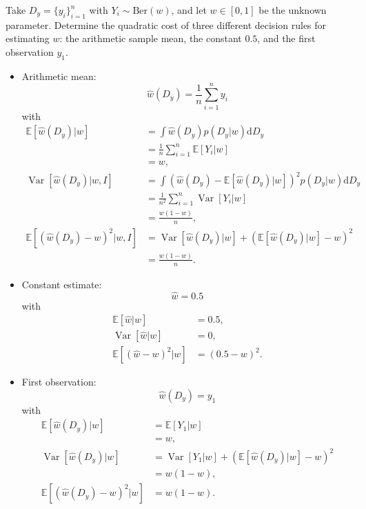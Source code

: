 \begin{example}
	Take $D_y= \{y_i\}_{i=1}^n$ with $Y_i \sim \mathrm{Ber}(w)$, and let $w\in [0,1]$ be the unknown parameter. Determine the quadratic cost of three different decision rules for estimating $w$: the arithmetic sample mean, the constant $0.5$, and the first observation $y_1$.
	
	\begin{itemize}
		\item Arithmetic mean:
		\begin{equation}
			\hat{w}(D_y) = \frac{1}{n} \sum_{i=1}^n y_i
		\end{equation}
		with
		\begin{equation}
			\begin{split}
				\mathbb{E}[\hat{w}(D_y)|w] &=  \int \hat{w}(D_y) p(D_y|w) \mathrm{d}D_y\\
				& = \frac{1}{n} \sum_{i=1}^n \mathbb{E}[Y_{i}|w]\\
				& = w,\\
				\operatorname{Var}[\hat{w}(D_y)|w,I] & =\int  (\hat{w}(D_y)-\mathbb{E}[\hat{w}(D_y)|w])^2 p(D_y|w) \mathrm{d}D_y\\
				 &= \frac{1}{n^2} \sum_{i=1}^n \operatorname{Var}[Y_{i}|w]\\
				 & = \frac{w(1-w)}{n},\\
				\mathbb{E}[(\hat{w}(D_y)-w)^2|w,I] &= \operatorname{Var}[\hat{w}(D_y)|w]+(\mathbb{E}[\hat{w}(D_y)|w]-w)^2\\
				& = \frac{w(1-w)}{n}.
			\end{split}
		\end{equation}
		
		\item Constant estimate:
		\begin{equation}
			\hat{w} = 0.5
		\end{equation}
		with
		\begin{equation}
			\begin{split}
				\mathbb{E}[\hat{w}|w] &= 0.5,\\
				\operatorname{Var}[\hat{w}|w] &= 0,\\
				\mathbb{E}[(\hat{w}-w)^2|w] &= (0.5 - w)^2.
			\end{split}
		\end{equation}
		
		\item First observation:
		\begin{equation}
			\hat{w}(D_y) = y_1
		\end{equation}
		with
		\begin{equation}
			\begin{split}
				\mathbb{E}[\hat{w}(D_y)|w] &= \mathbb{E}[Y_1|w]\\
				& = w,\\
				\operatorname{Var}[\hat{w}(D_y)|w] &= \operatorname{Var}[Y_1|w] +(\mathbb{E}[\hat{w}(D_y)|w]-w)^2\\
				&= w(1-w),\\
				\mathbb{E}[(\hat{w}(D_y)-w)^2|w] &= w(1-w).
			\end{split}
		\end{equation}
	\end{itemize}
	

\end{example}
